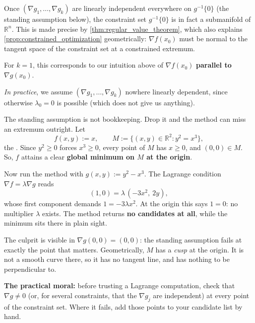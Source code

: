 \begin{remark}
Once $(\nabla g_1,\dots,\nabla g_k)$ are linearly independent everywhere on $g^{-1}\{0\}$ (the
standing assumption below), the constraint set $g^{-1}\{0\}$ is in fact a submanifold of
$\mathbb{R}^n$. This is made precise by \cref{thm:regular_value_theorem}, which also explains
\cref{prop:constrained_optimization} geometrically: $\nabla f(x_0)$ must be normal to the tangent
space of the constraint set at a constrained extremum.
\end{remark}

For $k = 1$, this corresponds to our intuition above of $\nabla f(x_0)$ \textbf{parallel to}
$\nabla g(x_0)$.

\textit{In practice}, we assume $(\nabla g_1, \dots, \nabla g_k)$ nowhere linearly dependent,
since otherwise $\lambda_0 = 0$ is possible (which does not give us anything).

\begin{aiexample}
\label{ex:constraint_qualification_fails}
The standing assumption is not bookkeeping. Drop it and the method can miss an extremum
outright. Let
\[f(x,y) := x, \qquad M := \{(x,y) \in \mathbb{R}^2 : y^2 = x^3\},\]
the  . Since $y^2 \geq 0$ forces
$x^3 \geq 0$, every point of $M$ has $x \geq 0$, and $(0,0) \in M$. So, $f$ attains a clear
\textbf{global minimum on $M$ at the origin}.

Now run the method with $g(x,y) := y^2-x^3$. The Lagrange condition $\nabla f = \lambda\nabla g$
reads
\[(1,0) = \lambda\,(-3x^2,\ 2y),\]
whose first component demands $1 = -3\lambda x^2$. At the origin this says $1 = 0$: no
multiplier $\lambda$ exists. The method returns \textbf{no candidates at all}, while the minimum
sits there in plain sight.

The culprit is visible in $\nabla g(0,0) = (0,0)$: the standing assumption fails at exactly the
point that matters. Geometrically, $M$ has a \emph{cusp} at the origin. It is not a smooth curve
there, so it has no tangent line, and  has nothing
to be perpendicular to.

\textbf{The practical moral:} before trusting a Lagrange computation, check that
$\nabla g \neq 0$ (or, for several constraints, that the $\nabla g_j$ are independent) at every
point of the constraint set. Where it fails, add those points to your candidate list by hand.
\end{aiexample}


